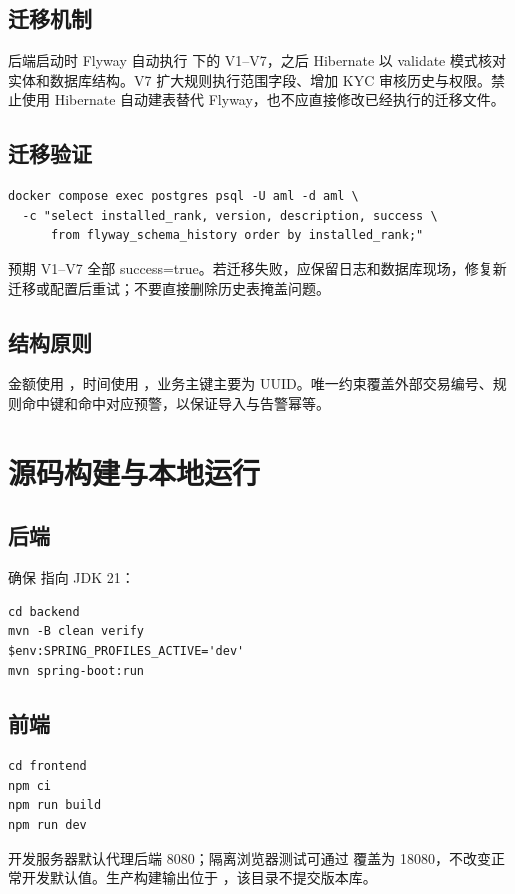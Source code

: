 \documentclass[UTF8,openany,zihao=-4]{ctexrep}
\begin{document}
\section{迁移机制}
后端启动时 Flyway 自动执行  下的 V1--V7，之后 Hibernate 以 validate 模式核对实体和数据库结构。V7 扩大规则执行范围字段、增加 KYC 审核历史与权限。禁止使用 Hibernate 自动建表替代 Flyway，也不应直接修改已经执行的迁移文件。

\section{迁移验证}
\begin{lstlisting}
docker compose exec postgres psql -U aml -d aml \
  -c "select installed_rank, version, description, success \
      from flyway_schema_history order by installed_rank;"
\end{lstlisting}
预期 V1--V7 全部 success=true。若迁移失败，应保留日志和数据库现场，修复新迁移或配置后重试；不要直接删除历史表掩盖问题。

\section{结构原则}
金额使用 ，时间使用 ，业务主键主要为 UUID。唯一约束覆盖外部交易编号、规则命中键和命中对应预警，以保证导入与告警幂等。

\chapter{源码构建与本地运行}
\section{后端}
确保  指向 JDK 21：
\begin{lstlisting}
cd backend
mvn -B clean verify
$env:SPRING_PROFILES_ACTIVE='dev'
mvn spring-boot:run
\end{lstlisting}

\section{前端}
\begin{lstlisting}
cd frontend
npm ci
npm run build
npm run dev
\end{lstlisting}
开发服务器默认代理后端 8080；隔离浏览器测试可通过  覆盖为 18080，不改变正常开发默认值。生产构建输出位于 ，该目录不提交版本库。
\end{document}
